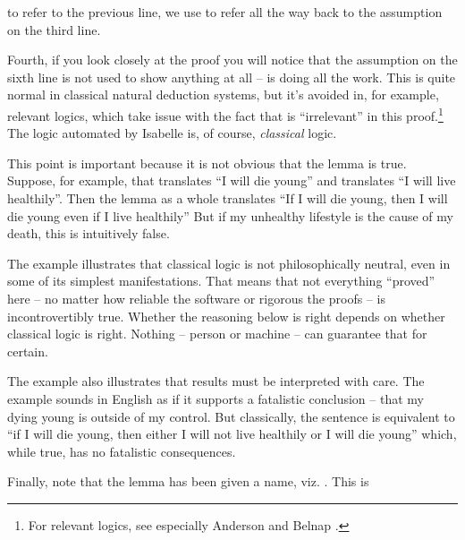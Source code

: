 \begin{isabellebody}
\begin{isamarkuptext}
to refer to the previous line, we use  to refer all the way back to the assumption
on the third line.%
\end{isamarkuptext}\isamarkuptrue%
%
\begin{isamarkuptext}%
Fourth, if you look closely at the proof you will notice that the assumption  on
the sixth line is not used to show anything at all --  is doing all the work. This is quite
normal in classical natural deduction systems, but it's avoided in, for example, relevant logics,
which take issue with the fact that  is ``irrelevant'' in this proof.\footnote{For relevant
logics, see especially Anderson and Belnap \cite{anderson_entailment_1976}.} The logic automated 
by Isabelle is, of course, \emph{classical} logic.%
\end{isamarkuptext}\isamarkuptrue%
%
\begin{isamarkuptext}%
This point is important because it is not obvious that the lemma is true. Suppose, for example,
that  translates ``I will die young'' and  translates ``I will live healthily''. 
Then the lemma as a whole translates ``If I will die young, then I will die young even if I live
healthily'' But if my unhealthy lifestyle is the cause of my death, this is intuitively false.%
\end{isamarkuptext}\isamarkuptrue%
%
\begin{isamarkuptext}%
The example illustrates that classical logic is not philosophically neutral, even in some of its 
simplest manifestations. That means that not everything ``proved'' here -- no matter how reliable
the software or rigorous the proofs -- is incontrovertibly true. Whether the reasoning below is right
depends on whether classical logic is right. Nothing -- person or machine -- can guarantee that for
certain.%
\end{isamarkuptext}\isamarkuptrue%
%
\begin{isamarkuptext}%
The example also illustrates that results must be interpreted with care. The example sounds
in English as if it supports a fatalistic conclusion -- that my dying young is outside of my control.
But classically, the sentence is equivalent to ``if I will die young, then either I will not live
healthily or I will die young'' which, while true, has no fatalistic consequences.%
\end{isamarkuptext}\isamarkuptrue%
%
\begin{isamarkuptext}%
Finally, note that the lemma has been given a name, viz. . This is

\end{isamarkuptext}
\end{isabellebody}
